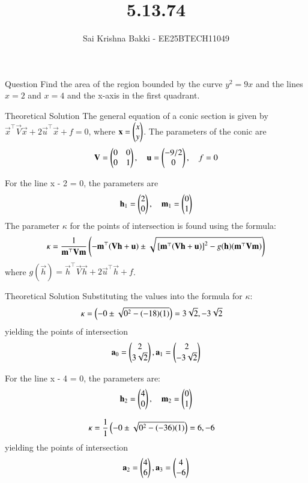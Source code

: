 \documentclass{beamer}
\title %
{5.13.74}
\date{}
\author %
{Sai Krishna Bakki - EE25BTECH11049}
\begin{document}
\frame{\titlepage}
\begin{frame}{Question}
Find the area of the region bounded by the curve $y^2 = 9x$ and the lines $x = 2$ and $x = 4$ and the x-axis in the first quadrant.
\end{frame}
\begin{frame}{Theoretical Solution}
    The general equation of a conic section is given by $\vec{x}^\top\vec{V}\vec{x} + 2\vec{u}^\top\vec{x} + f = 0$, where $\mathbf{x} = \begin{pmatrix}x \\ y\end{pmatrix}$.
The parameters of the conic are
\begin{align}
\mathbf{V} = \begin{pmatrix}0 & 0 \\ 0 & 1\end{pmatrix}, \quad \mathbf{u} = \begin{pmatrix}-9/2 \\ 0\end{pmatrix}, \quad f = 0
\end{align}

For the line x - 2 = 0, the parameters are
\begin{align}
\mathbf{h}_1 = \begin{pmatrix}2 \\ 0\end{pmatrix}, \quad \mathbf{m}_1 = \begin{pmatrix}0 \\ 1\end{pmatrix}
\end{align}
The parameter $\kappa$ for the points of intersection is found using the formula:
\begin{align}
\kappa = \frac{1}{\mathbf{m}^\top \mathbf{V} \mathbf{m}}\left(-\mathbf{m}^\top(\mathbf{V}\mathbf{h}+\mathbf{u}) \pm \sqrt{{}\left[\mathbf{m}^\top(\mathbf{V}\mathbf{h}+\mathbf{u})\right]^2 - g(\mathbf{h})(\mathbf{m}^\top \mathbf{V} \mathbf{m})}\right)
\end{align}
where $g(\vec{h}) = \vec{h}^\top \vec{V} \vec{h} + 2\vec{u}^\top \vec{h} + f$.
\end{frame}
\begin{frame}{Theoretical Solution}
Substituting the values into the formula for $\kappa$:
\begin{align}
\kappa &= \left(-0 \pm \sqrt{0^2 - (-18)(1)}\right) = 3\sqrt{2},-3\sqrt{2}
\end{align}
yielding the points of intersection
\begin{align}
\mathbf{a}_0 =  \begin{pmatrix}2 \\ 3\sqrt{2}\end{pmatrix},\mathbf{a}_1 =  \begin{pmatrix}2 \\ -3\sqrt{2}\end{pmatrix}
\end{align}

For the line x - 4 = 0, the parameters are:
\begin{align}
\mathbf{h}_2 = \begin{pmatrix}4 \\ 0\end{pmatrix}, \quad \mathbf{m}_2 = \begin{pmatrix}0 \\ 1\end{pmatrix}
\end{align}

\begin{align}
\kappa &= \frac{1}{1}\left(-0 \pm \sqrt{0^2 - (-36)(1)}\right) = 6,-6
\end{align}
yielding the points of intersection
\begin{align}
\mathbf{a}_2 = \begin{pmatrix}4 \\ 6\end{pmatrix},\mathbf{a}_3 = \begin{pmatrix}4 \\ -6\end{pmatrix}
\end{align}
\end{frame}
\end{document}
